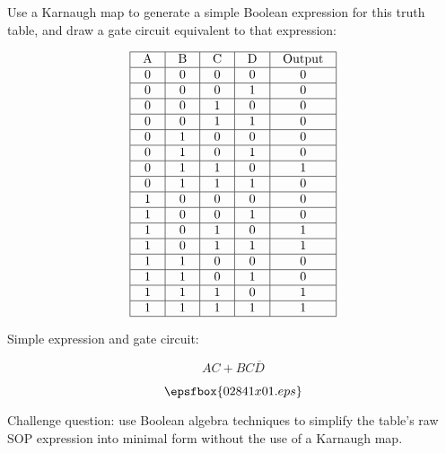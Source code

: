 

Use a Karnaugh map to generate a simple Boolean expression for this truth table, and draw a gate circuit equivalent to that expression:


$$\vbox{\offinterlineskip
\halign{\strut
\vrule \quad\hfil # \ \hfil & 
\vrule \quad\hfil # \ \hfil & 
\vrule \quad\hfil # \ \hfil & 
\vrule \quad\hfil # \ \hfil & 
\vrule \quad\hfil # \ \hfil \vrule \cr
\noalign{\hrule}
%
A & B & C & D & Output \cr
%
\noalign{\hrule}
%
0 & 0 & 0 & 0 & 0 \cr
%
\noalign{\hrule}
%
0 & 0 & 0 & 1 & 0 \cr
%
\noalign{\hrule}
%
0 & 0 & 1 & 0 & 0 \cr
%
\noalign{\hrule}
%
0 & 0 & 1 & 1 & 0 \cr
%
\noalign{\hrule}
%
0 & 1 & 0 & 0 & 0 \cr
%
\noalign{\hrule}
%
0 & 1 & 0 & 1 & 0 \cr
%
\noalign{\hrule}
%
0 & 1 & 1 & 0 & 1 \cr
%
\noalign{\hrule}
%
0 & 1 & 1 & 1 & 0 \cr
%
\noalign{\hrule}
%
1 & 0 & 0 & 0 & 0 \cr
%
\noalign{\hrule}
%
1 & 0 & 0 & 1 & 0 \cr
%
\noalign{\hrule}
%
1 & 0 & 1 & 0 & 1 \cr
%
\noalign{\hrule}
%
1 & 0 & 1 & 1 & 1 \cr
%
\noalign{\hrule}
%
1 & 1 & 0 & 0 & 0 \cr
%
\noalign{\hrule}
%
1 & 1 & 0 & 1 & 0 \cr
%
\noalign{\hrule}
%
1 & 1 & 1 & 0 & 1 \cr
%
\noalign{\hrule}
%
1 & 1 & 1 & 1 & 1 \cr
%
\noalign{\hrule}
} %
}$$ %







Simple expression and gate circuit:

$$AC + BC\overline{D}$$

$$\epsfbox{02841x01.eps}$$

\vskip 10pt

Challenge question: use Boolean algebra techniques to simplify the table's raw SOP expression into minimal form without the use of a Karnaugh map.






